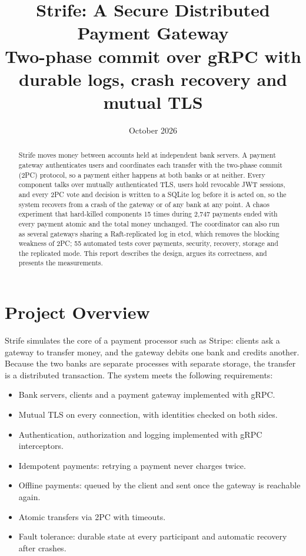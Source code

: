 \documentclass[11pt]{article}
\title{\textbf{Strife: A Secure Distributed Payment Gateway}\\[4pt]
\large Two-phase commit over gRPC with durable logs, crash recovery and mutual TLS}
\date{October 2026}
\begin{document}
\sloppy
\maketitle

\begin{abstract}
Strife moves money between accounts held at independent bank servers. A
payment gateway authenticates users and coordinates each transfer with the
two-phase commit (2PC) protocol, so a payment either happens at both banks or
at neither. Every component talks over mutually authenticated TLS, users hold
revocable JWT sessions, and every 2PC vote and decision is written to a SQLite
log before it is acted on, so the system recovers from a crash of the gateway
or of any bank at any point. A chaos experiment that hard-killed components 15
times during 2,747 payments ended with every payment atomic and the total money
unchanged. The coordinator can also run as several gateways sharing a
Raft-replicated log in etcd, which removes the blocking weakness of 2PC; 55
automated tests cover payments, security, recovery, storage and the replicated
mode. This
report describes the design, argues its correctness, and presents the
measurements.
\end{abstract}

\section{Project Overview}

Strife simulates the core of a payment processor such as Stripe: clients ask a
gateway to transfer money, and the gateway debits one bank and credits another.
Because the two banks are separate processes with separate storage, the
transfer is a distributed transaction. The system meets the following
requirements:

\begin{itemize}
  \item Bank servers, clients and a payment gateway implemented with gRPC.
  \item Mutual TLS on every connection, with identities checked on both sides.
  \item Authentication, authorization and logging implemented with gRPC
        interceptors.
  \item Idempotent payments: retrying a payment never charges twice.
  \item Offline payments: queued by the client and sent once the gateway is
        reachable again.
  \item Atomic transfers via 2PC with timeouts.
  \item Fault tolerance: durable state at every participant and automatic
        recovery after crashes.
\end{itemize}
\end{document}
